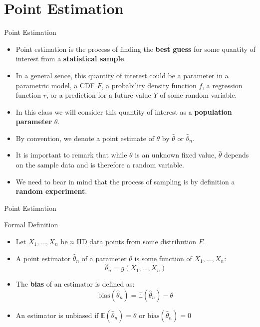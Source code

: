 \documentclass[handout]{beamer}
\begin{document}
\section{Point Estimation}

\begin{frame}{Point Estimation}
\scriptsize{
\begin{itemize}
 \item Point estimation is the process of finding the \textbf{best guess} for some quantity of interest from a \textbf{statistical sample}.
 \item In a general sence, this quantity of interest could be a parameter in a parametric model, a CDF $F$, a probability density function $f$, a regression function $r$, or a prediction for a future value $Y$ of some random variable.
 \item In this class we will consider this quantity of interest as a \textbf{population parameter} $\theta$. 
  \item By convention, we denote a point estimate of $\theta$ by $\hat{\theta}$ or $\hat{\theta}_n$.
 \item It is important to remark that while $\theta$ is an unknown fixed value, $\hat{\theta}$  depends on the sample data and is therefore a random variable. 
 \item We need to bear in mind that the process of sampling is by definition a \textbf{random experiment}. 
 
\end{itemize}

} 
\end{frame}

\begin{frame}{Point Estimation}


\scriptsize{
\begin{block}{Formal Definition}
\begin{itemize}
 \item Let $X_1, \dots, X_n$ be $n$ IID data points  from some distribution  $F$.
 \item A point estimator $\hat{\theta}_n$  of a parameter $\theta$ is some function of $X_1, \dots, X_n$:
 \begin{displaymath}
 \hat{\theta}_n=g(X_1, \dots, X_n) 
 \end{displaymath}
 
\end{itemize}

 
\end{block}

\begin{itemize}
 \item The \textbf{bias} of an estimator is defined as: 
\begin{displaymath}
 \text{bias}(\hat{\theta}_n)=\mathbb{E}(\hat{\theta}_n)-\theta
\end{displaymath}
\item An estimator is unbiased if $\mathbb{E}(\hat{\theta}_n)=\theta$ or  $\text{bias}(\hat{\theta}_n)=0 $
\end{itemize}

} 
\end{frame}
\end{document}
